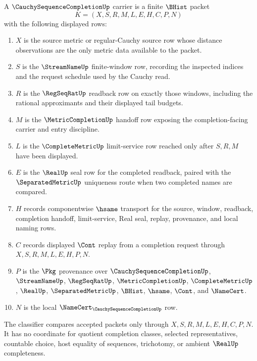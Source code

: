 \begin{definition}
\label{def:cauchy-sequence-completion-carrier}
A $\CauchySequenceCompletionUp$ carrier is a finite $\BHist$ packet
$$
K=(X,S,R,M,L,E,H,C,P,N)
$$
with the following displayed rows:
\begin{enumerate}
\item $X$ is the source metric or regular-Cauchy source row whose distance observations are the only metric data available to the packet.
\item $S$ is the $\StreamNameUp$ finite-window row, recording the inspected indices and the request schedule used by the Cauchy read.
\item $R$ is the $\RegSeqRatUp$ readback row on exactly those windows, including the rational approximants and their displayed tail budgets.
\item $M$ is the $\MetricCompletionUp$ handoff row exposing the completion-facing carrier and entry discipline.
\item $L$ is the $\CompleteMetricUp$ limit-service row reached only after $S,R,M$ have been displayed.
\item $E$ is the $\RealUp$ seal row for the completed readback, paired with the $\SeparatedMetricUp$ uniqueness route when two completed names are compared.
\item $H$ records componentwise $\hsame$ transport for the source, window, readback, completion handoff, limit-service, Real seal, replay, provenance, and local naming rows.
\item $C$ records displayed $\Cont$ replay from a completion request through $X,S,R,M,L,E,H,P,N$.
\item $P$ is the $\Pkg$ provenance over $\CauchySequenceCompletionUp$, $\StreamNameUp$, $\RegSeqRatUp$, $\MetricCompletionUp$, $\CompleteMetricUp$, $\RealUp$, $\SeparatedMetricUp$, $\BHist$, $\hsame$, $\Cont$, and $\NameCert$.
\item $N$ is the local $\NameCert_{\CauchySequenceCompletionUp}$ row.
\end{enumerate}
The classifier compares accepted packets only through $X,S,R,M,L,E,H,C,P,N$. It has no coordinate for quotient completion classes, selected representatives, countable choice, host equality of sequences, trichotomy, or ambient $\RealUp$ completeness.
\end{definition}

